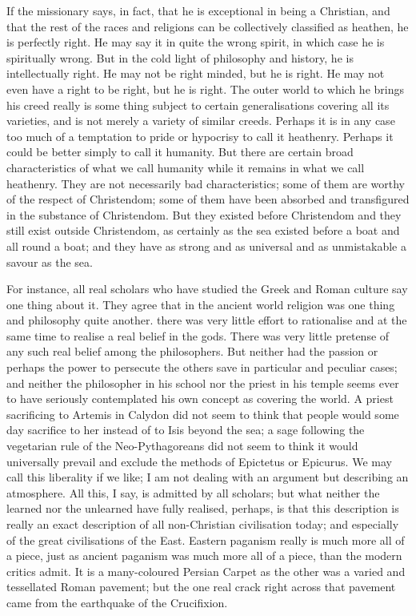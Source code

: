 If the missionary says, in fact, that he is exceptional in being a Christian, and that the rest of the races and religions can be collectively classified as heathen, he is perfectly right. He may say it in quite the wrong spirit, in which case he is spiritually wrong. But in the cold light of philosophy and history, he is intellectually right. He may not be right minded, but he is right. He may not even have a right to be right, but he is right. The outer world to which he brings his creed really is some thing subject to certain generalisations covering all its varieties, and is not merely a variety of similar creeds. Perhaps it is in any case too much of a temptation to pride or hypocrisy to call it heathenry. Perhaps it could be better simply to call it humanity. But there are certain broad characteristics of what we call humanity while it remains in what we call heathenry. They are not necessarily bad characteristics; some of them are worthy of the respect of Christendom; some of them have been absorbed and transfigured in the substance of Christendom. But they existed before Christendom and they still exist outside Christendom, as certainly as the sea existed before a boat and all round a boat; and they have as strong and as universal and as unmistakable a savour as the sea.

For instance, all real scholars who have studied the Greek and Roman culture say one thing about it. They agree that in the ancient world religion was one thing and philosophy quite another. there was very little effort to rationalise and at the same time to realise a real belief in the gods. There was very little pretense of any such real belief among the philosophers. But neither had the passion or perhaps the power to persecute the others save in particular and peculiar cases; and neither the philosopher in his school nor the priest in his temple seems ever to have seriously contemplated his own concept as covering the world. A priest sacrificing to Artemis in Calydon did not seem to think that people would some day sacrifice to her instead of to Isis beyond the sea; a sage following the vegetarian rule of the Neo-Pythagoreans did not seem to think it would universally prevail and exclude the methods of Epictetus or Epicurus. We may call this liberality if we like; I am not dealing with an argument but describing an atmosphere. All this, I say, is admitted by all scholars; but what neither the learned nor the unlearned have fully realised, perhaps, is that this description is really an exact description of all non-Christian civilisation today; and especially of the great civilisations of the East. Eastern paganism really is much more all of a piece, just as ancient paganism was much more all of a piece, than the modern critics admit. It is a many-coloured Persian Carpet as the other was a varied and tessellated Roman pavement; but the one real crack right across that pavement came from the earthquake of the Crucifixion.

